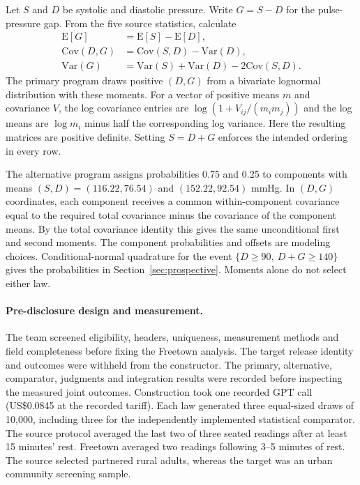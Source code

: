 Let $S$ and $D$ be systolic and diastolic pressure. Write $G=S-D$ for the pulse-pressure gap. From the five source statistics, calculate
\begin{align*}
\mathrm{E}[G] &= \mathrm{E}[S]-\mathrm{E}[D],\\
\mathrm{Cov}(D,G) &= \mathrm{Cov}(S,D)-\mathrm{Var}(D),\\
\mathrm{Var}(G) &= \mathrm{Var}(S)+\mathrm{Var}(D)-2\mathrm{Cov}(S,D).
\end{align*}
The primary program draws positive $(D,G)$ from a bivariate lognormal distribution with these moments. For a vector of positive means $m$ and covariance $V$, the log covariance entries are $\log(1+V_{ij}/(m_i m_j))$ and the log means are $\log m_i$ minus half the corresponding log variance. Here the resulting matrices are positive definite. Setting $S=D+G$ enforces the intended ordering in every row.

The alternative program assigns probabilities 0.75 and 0.25 to components with means $(S,D)=(116.22,76.54)$ and $(152.22,92.54)$ mmHg. In $(D,G)$ coordinates, each component receives a common within-component covariance equal to the required total covariance minus the covariance of the component means. By the total covariance identity this gives the same unconditional first and second moments. The component probabilities and offsets are modeling choices. Conditional-normal quadrature for the event $\{D\geq90,\ D+G\geq140\}$ gives the probabilities in Section~\ref{sec:prospective}. Moments alone do not select either law.

\paragraph{Pre-disclosure design and measurement.}
The team screened eligibility, headers, uniqueness, measurement methods and field completeness before fixing the Freetown analysis. The target release identity and outcomes were withheld from the constructor. The primary, alternative, comparator, judgments and integration results were recorded before inspecting the measured joint outcomes. Construction took one recorded GPT call (US\$0.0845 at the recorded tariff). Each law generated three equal-sized draws of 10,000, including three for the independently implemented statistical comparator. The source protocol averaged the last two of three seated readings after at least 15 minutes' rest. Freetown averaged two readings following 3--5 minutes of rest. The source selected partnered rural adults, whereas the target was an urban community screening sample.

